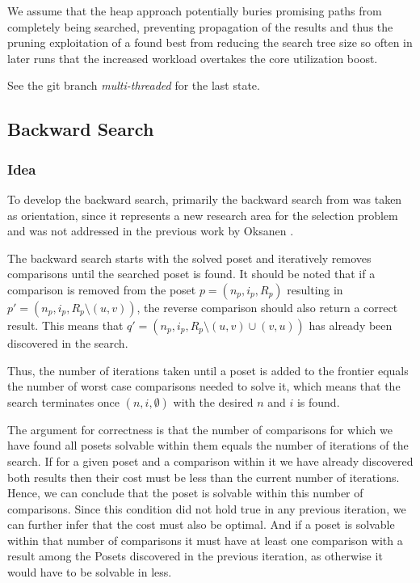 \documentclass[10pt,journal,compsoc]{IEEEtran}
\begin{document}
We assume that the heap approach potentially buries promising paths
from completely being searched, preventing propagation of the results
and thus the pruning exploitation of a found best from reducing
the search tree size so often in later runs that the increased
workload overtakes the core utilization boost.

See the git branch \textit{multi-threaded} for the last state.

\subsection{Backward Search} \label{sec:backward}

\subsubsection{Idea}

To develop the backward search, primarily the backward search from \cite{stober2022lower} was taken as orientation, since it represents a new research area for the selection problem and was not addressed in the previous work by Oksanen \cite{Oksanen}.

The backward search starts with the solved poset and iteratively removes comparisons until the searched poset is found.
It should be noted that if a comparison is removed from the poset $p = (n_p, i_p, R_p)$ resulting in $p' = (n_p, i_p, R_p \setminus (u, v))$, the reverse comparison should also return a correct result.
This means that $q' = (n_p, i_p, R_p \setminus (u, v) \cup (v, u))$ has already been discovered in the search.

Thus, the number of iterations taken until a poset is added to the frontier equals the number of worst case comparisons needed to solve it, which means that the search terminates once $(n, i, \emptyset)$ with the desired $n$ and $i$ is found.

The argument for correctness is that the number of comparisons for which we have found all posets solvable within them equals the number of iterations of the search.
If for a given poset and a comparison within it we have already discovered both results then their cost must be less than the current number of iterations.
Hence, we can conclude that the poset is solvable within this number of comparisons.
Since this condition did not hold true in any previous iteration, we can further infer that the cost must also be optimal.
And if a poset is solvable within that number of comparisons it must have at least one comparison with a result among the Posets discovered in the previous iteration, as otherwise it would have to be solvable in less.
\end{document}
